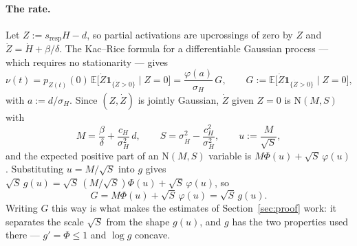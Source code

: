 \documentclass[11pt,a4paper]{article}
\theoremstyle{remark}\newtheorem{remark}[proposition]{Remark}
\newcommand{\E}{\mathbb{E}}
\begin{document}
\paragraph{The rate.}
Let $Z:=s_{\mathrm{resp}}H-d$, so partial activations are upcrossings of zero by $Z$
and $\dot Z=\dot H+\beta/\delta$. The Kac--Rice formula for a differentiable Gaussian
process --- which requires no stationarity --- gives
\begin{equation}
\nu(t)=p_{Z(t)}(0)\,\E\bigl[\dot Z\mathbf{1}_{\{\dot Z>0\}}\mid Z=0\bigr]
=\frac{\varphi(a)}{\sigma_H}\,G,
\qquad G:=\E\bigl[\dot Z\mathbf{1}_{\{\dot Z>0\}}\mid Z=0\bigr],
\label{eq:nu}
\end{equation}
with $a:=d/\sigma_H$. Since $(Z,\dot Z)$ is jointly Gaussian, $\dot Z$ given $Z=0$ is
$\mathrm{N}(M,S)$ with
\begin{equation}
M=\frac{\beta}{\delta}+\frac{c_H}{\sigma_H^{2}}\,d,
\qquad
S=\sigma_{\dot H}^{2}-\frac{c_H^{2}}{\sigma_H^{2}},
\qquad
u:=\frac{M}{\sqrt S},
\label{eq:MSu}
\end{equation}
and the expected positive part of an $\mathrm{N}(M,S)$ variable is
$M\Phi(u)+\sqrt S\,\varphi(u)$. Substituting $u=M/\sqrt S$ into $g$ gives
$\sqrt S\,g(u)=\sqrt S\,(M/\sqrt S)\Phi(u)+\sqrt S\,\varphi(u)$, so
\begin{equation}
G=M\Phi(u)+\sqrt S\,\varphi(u)=\sqrt S\,g(u).
\label{eq:Gid}
\end{equation}
Writing $G$ this way is what makes the estimates of Section~\ref{sec:proof} work: it
separates the scale $\sqrt S$ from the shape $g(u)$, and $g$ has the two properties
used there --- $g'=\Phi\le1$ and $\log g$ concave.
\end{document}
